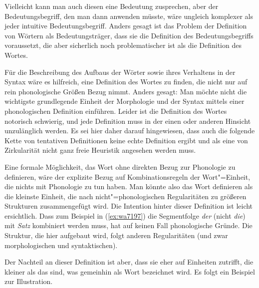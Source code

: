 \begin{exe}
\end{exe}

Vielleicht kann man auch diesen eine Bedeutung zusprechen, aber der Bedeutungsbegriff, den man dann anwenden müsste, wäre ungleich komplexer als jeder intuitive Bedeutungsbegriff.
Anders gesagt ist das Problem der Definition von Wörtern als Bedeutungsträger, dass sie die Definition des Bedeutungsbegriffs voraussetzt, die aber sicherlich noch problematischer ist als die Definition des Wortes.

Für die Beschreibung des Aufbaus der Wörter sowie ihres Verhaltens in der Syntax wäre es hilfreich, eine Definition des Wortes zu finden, die nicht nur auf rein phonologische Größen Bezug nimmt.
Anders gesagt:
Man möchte nicht die wichtigste grundlegende Einheit der Morphologie und der Syntax mittels einer phonologischen Definition einführen.
Leider ist die Definition des Wortes notorisch schwierig, und jede Definition muss in der einen oder anderen Hinsicht unzulänglich werden.
Es sei hier daher darauf hingewiesen, dass auch die folgende Kette von tentativen Definitionen keine echte Definition ergibt und als eine von Zirkularität nicht ganz freie Heuristik angesehen werden muss.

Eine formale Möglichkeit, das Wort ohne direkten Bezug zur Phonologie zu definieren, wäre der explizite Bezug auf Kombinationsregeln der Wort"=Einheit, die nichts mit Phonologie zu tun haben.
Man könnte also das Wort definieren als die kleinste Einheit, die nach nicht"=phonologischen Regularitäten zu größeren Strukturen zusammengefügt wird.
Die Intention hinter dieser Definition ist leicht ersichtlich.
Dass zum Beispiel in (\ref{ex:wa7197}) die Segmentfolge \textit{der} (nicht \textit{die}) mit \textit{Satz} kombiniert werden muss, hat auf keinen Fall phonologische Gründe.
Die Struktur, die hier aufgebaut wird, folgt anderen Regularitäten (und zwar morphologischen und syntaktischen).

\begin{exe}
  \ex\label{ex:wa7197}
  \begin{xlist}
  \end{xlist}
\end{exe}

Der Nachteil an dieser Definition ist aber, dass sie eher auf Einheiten zutrifft, die kleiner als das sind, was gemeinhin als Wort bezeichnet wird.
Es folgt ein Beispiel zur Illustration.

